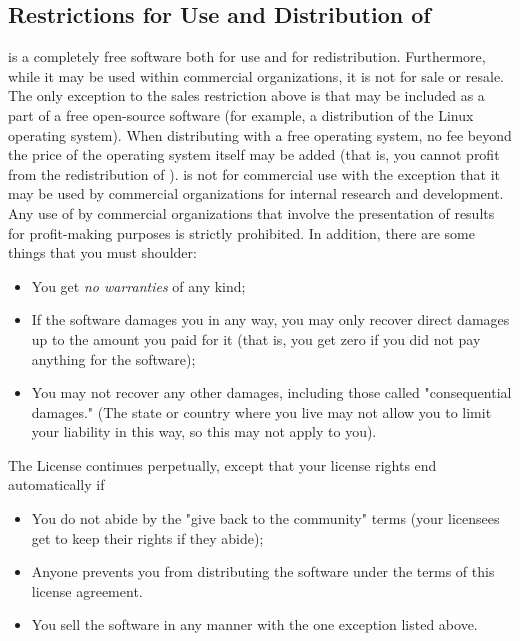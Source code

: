 \subsection*{Restrictions for Use and Distribution of \gpops}

\gpops is a completely free software both for use and for
redistribution.  Furthermore, while it may be used within commercial
organizations, it is not for sale or resale.  The only exception to
the sales restriction above is that \gpops may be included as a part of
a free open-source software (for example, a distribution of the Linux
operating system).  When distributing \gpops with a free
operating system, no fee beyond the price of the operating system
itself may be added (that is, you cannot profit from the
redistribution of \gpops). \gpops is not for commercial use with
the exception that it may be used by commercial organizations for
internal research and development.  Any use of \gpops by commercial
organizations that involve the presentation of results for
profit-making purposes is strictly prohibited.  In addition, there are
some things that you must shoulder:
\begin{itemize}
\item You get {\em no warranties} of any kind;
\item If the software damages you in any way, you may only recover
direct damages up to the amount you paid for it (that is, you get zero
if you did not pay anything for the software);
\item You may not recover any other damages, including those called
"consequential damages." (The state or country where you live may not
allow you to limit your liability in this way, so this may not apply
to you).
\end{itemize}
The \gpops License continues perpetually, except that your license
rights end automatically if
\begin{itemize}
\item You do not abide by the "give back to the community" terms (your
licensees get to keep their rights if they abide);
\item Anyone prevents you from distributing the software under the
terms of this license agreement.
\item You sell the software in any manner with the one exception
listed above.
\end{itemize}

